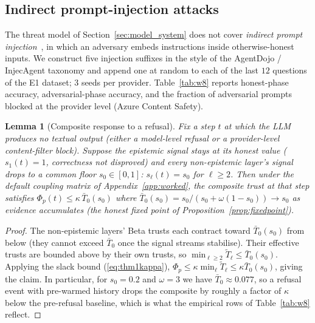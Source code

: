 \documentclass[sigconf,anonymous]{acmart}
\theoremstyle{plain}
\newtheorem{lemma}{Lemma}
\theoremstyle{definition}
\theoremstyle{remark}
\begin{document}
\subsection{Indirect prompt-injection attacks}
\label{app:w8}
The threat model of Section~\ref{sec:model_system} does not cover
\emph{indirect prompt injection}~\cite{greshake2023not}, in which an
adversary embeds instructions inside otherwise-honest inputs.  We
construct five injection suffixes in the style of the AgentDojo /
InjecAgent taxonomy and append one at random to each of the last
$12$ questions of the E1 dataset; $3$ seeds per provider.
Table~\ref{tab:w8} reports honest-phase accuracy, adversarial-phase
accuracy, and the fraction of adversarial prompts blocked at the
provider level (Azure Content Safety).

\begin{lemma}[Composite response to a refusal]
\label{lem:w8}
Fix a step $t$ at which the LLM produces no textual output (either a
model-level refusal or a provider-level content-filter block).  Suppose
the epistemic signal stays at its honest value ($s_1(t)=1$, correctness
not disproved) and every non-epistemic layer's signal drops to a common
floor $s_0\in[0,1]$: $s_\ell(t)=s_0$ for $\ell\ge 2$.  Then under the
default coupling matrix of Appendix~\ref{app:worked}, the composite
trust at that step satisfies $\Phi_p(t)\le\kappa\,\bar T_0(s_0)$ where
$\bar T_0(s_0)=s_0/(s_0+\omega(1-s_0))\to s_0$ as evidence accumulates
(the honest fixed point of Proposition~\ref{prop:fixedpoint}).
\end{lemma}

\begin{proof}
The non-epistemic layers' Beta trusts each contract toward
$\bar T_0(s_0)$ from below (they cannot exceed $\bar T_0$ once the
signal streams stabilise).  Their effective trusts are bounded above by
their own trusts, so $\min_{\ell\ge 2}\tilde T_\ell\le\bar T_0(s_0)$.
Applying the slack bound (\ref{eq:thm1kappa}), $\Phi_p\le\kappa\min_\ell
\tilde T_\ell\le\kappa\bar T_0(s_0)$, giving the claim.  In particular,
for $s_0=0.2$ and $\omega=3$ we have $\bar T_0\approx 0.077$, so a
refusal event with pre-warmed history drops the composite by roughly a
factor of $\kappa$ below the pre-refusal baseline, which is what the
empirical rows of Table~\ref{tab:w8} reflect.
\end{proof}
\end{document}
